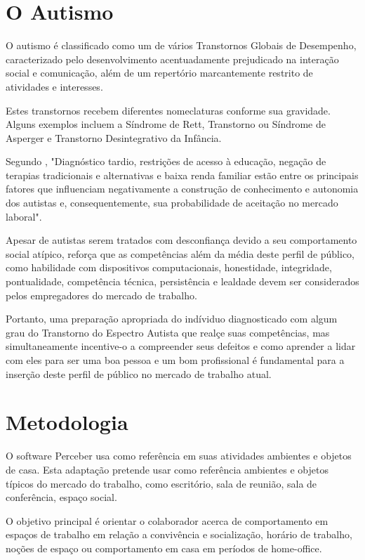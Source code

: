\documentclass[12pt]{article}
\begin{document}
\section{O Autismo}

O autismo é classificado como um de vários Transtornos Globais de Desempenho, caracterizado pelo desenvolvimento acentuadamente prejudicado na interação social e comunicação, além de um repertório marcantemente restrito de atividades e interesses.

Estes transtornos recebem diferentes nomeclaturas conforme sua gravidade. Alguns exemplos incluem a Síndrome de Rett, Transtorno ou Síndrome de Asperger e Transtorno Desintegrativo da Infância.

Segundo \cite{leopoldino:17}, "Diagnóstico tardio, restrições de acesso à educação, negação de terapias tradicionais e alternativas e baixa renda familiar estão entre os principais fatores que influenciam negativamente a construção de conhecimento e autonomia dos autistas e, consequentemente, sua probabilidade de aceitação no mercado laboral".

Apesar de autistas serem tratados com desconfiança devido a seu comportamento social atípico, \cite{schmidt:15} reforça que as competências além da média deste perfil de público, como habilidade com dispositivos computacionais, honestidade, integridade, pontualidade, competência técnica, persistência e lealdade devem ser considerados pelos empregadores do mercado de trabalho.

Portanto, uma preparação apropriada do indíviduo diagnosticado com algum grau do Transtorno do Espectro Autista que realçe suas competências, mas simultaneamente incentive-o a compreender seus defeitos e como aprender a lidar com eles para ser uma boa pessoa e um bom profissional é fundamental para a inserção deste perfil de público no mercado de trabalho atual.

\section{Metodologia}

O software Perceber usa como referência em suas atividades ambientes e objetos de casa. Esta adaptação pretende usar como referência ambientes e objetos típicos do mercado do trabalho, como escritório, sala de reunião, sala de conferência, espaço social.

O objetivo principal é orientar o colaborador acerca de comportamento em espaços de trabalho em relação a convivência e socialização, horário de trabalho, noções de espaço ou comportamento em casa em períodos de home-office.
\end{document}
